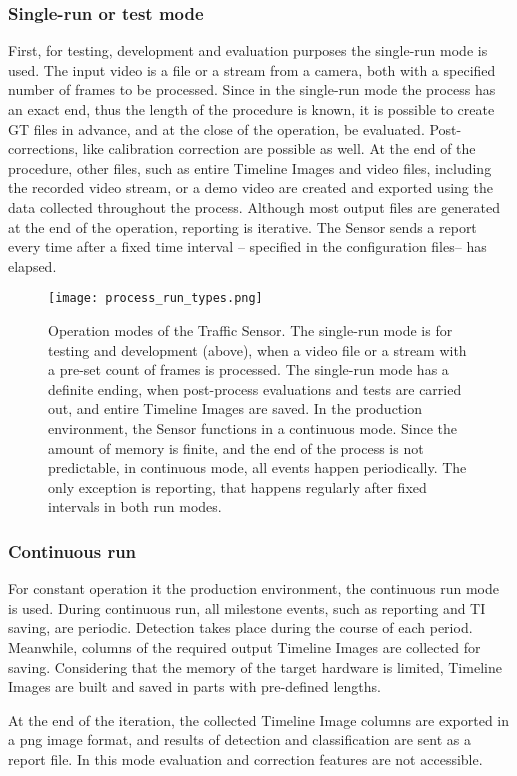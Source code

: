 \subsubsection{Single-run or test mode}\label{sec:run_modes}
First, for testing, development and evaluation purposes the single-run mode is used.
The input video is a file or a stream from a camera, both with a specified number of frames to be processed.
Since in the single-run mode the process has an exact end, thus the length of the procedure is known, it is possible to create GT files in advance, and at the close of the operation, be evaluated.
Post-corrections, like calibration correction are possible as well.
At the end of the procedure, other files, such as entire Timeline Images and video files, including the recorded video stream, or a demo video are created and exported using the data collected throughout the process.
Although most output files are generated at the end of the operation, reporting is iterative.
The Sensor sends a report every time after a fixed time interval -- specified in the configuration files-- has elapsed.

\begin{figure}[htb]
	\centering
	\texttt{[image: process\_run\_types.png]}
	\caption[Operation modes of the Traffic Sensor]{Operation modes of the Traffic Sensor. The single-run mode is for testing and development (above), when a video file or a stream with a pre-set count of frames is processed. The single-run mode has a definite ending, when post-process evaluations and tests are carried out, and entire Timeline Images are saved. In the production environment, the Sensor functions in a continuous mode. Since the amount of memory is finite, and the end of the process is not predictable, in continuous mode, all events happen periodically. The only exception is reporting, that happens regularly after fixed intervals in both run modes. \label{fig:run_types}}
\end{figure}
\subsubsection{Continuous run}
For constant operation it the production environment, the continuous run mode is used.
During continuous run, all milestone events, such as reporting and TI saving, are periodic. 
Detection takes place during the course of each period. 
Meanwhile, columns of the required output Timeline Images are collected for saving.
Considering that the memory of the target hardware is limited, Timeline Images are built and saved in parts with pre-defined lengths.

At the end of the iteration, the collected Timeline Image columns are exported in a png image format, and results of detection and classification are sent as a report file.
In this mode evaluation and correction features are not accessible.